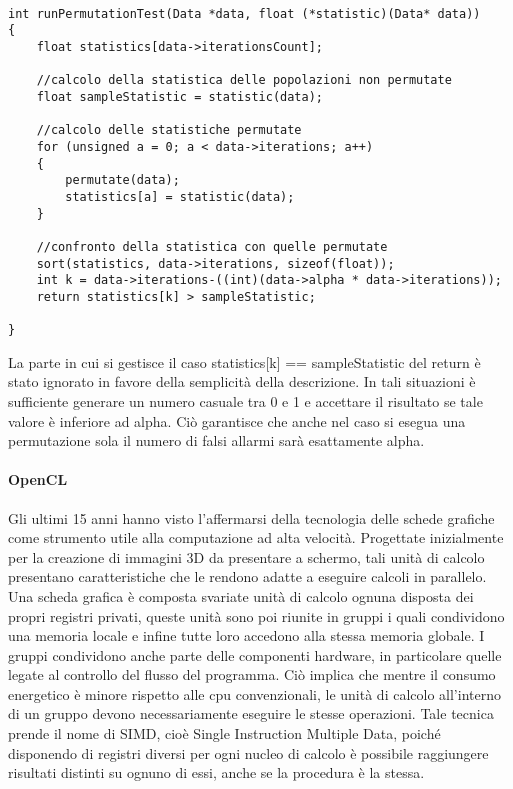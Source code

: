 \begin{lstlisting}[style=CStyle]

int runPermutationTest(Data *data, float (*statistic)(Data* data))
{
	float statistics[data->iterationsCount];
	
	//calcolo della statistica delle popolazioni non permutate
	float sampleStatistic = statistic(data); 	
	
	//calcolo delle statistiche permutate
	for (unsigned a = 0; a < data->iterations; a++)
	{
		permutate(data);
		statistics[a] = statistic(data);
	}
	
	//confronto della statistica con quelle permutate
	sort(statistics, data->iterations, sizeof(float));
	int k = data->iterations-((int)(data->alpha * data->iterations));	
	return statistics[k] > sampleStatistic;
	
}
\end{lstlisting}

La parte in cui si gestisce il caso statistics[k] == sampleStatistic del return è stato ignorato in favore della semplicità della descrizione. In tali situazioni è sufficiente generare un numero casuale tra 0 e 1 e accettare il risultato se tale valore è inferiore ad alpha. Ciò garantisce che anche nel caso si esegua una permutazione sola il numero di falsi allarmi sarà esattamente alpha.


\paragraph{OpenCL}

Gli ultimi 15 anni hanno visto l'affermarsi della tecnologia delle schede grafiche come strumento utile alla computazione ad alta velocità.
Progettate inizialmente per la creazione di immagini 3D da presentare a schermo, tali unità di calcolo presentano caratteristiche che le rendono adatte a eseguire calcoli in parallelo.
Una scheda grafica è composta svariate unità di calcolo ognuna disposta dei propri registri privati, queste unità sono poi riunite in gruppi i quali condividono una memoria locale e infine tutte loro accedono alla stessa memoria globale. 
I gruppi condividono anche parte delle componenti hardware, in particolare quelle legate al controllo del flusso del programma. Ciò implica che mentre il consumo energetico è minore rispetto alle cpu convenzionali, le unità di calcolo all'interno di un gruppo devono necessariamente eseguire le stesse operazioni. Tale tecnica prende il nome di SIMD, cioè Single Instruction Multiple Data, poiché disponendo di registri diversi per ogni nucleo di calcolo è possibile raggiungere risultati distinti su ognuno di essi, anche se la procedura è la stessa.

